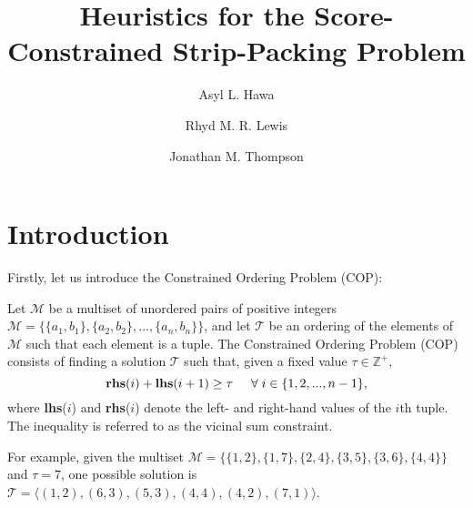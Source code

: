 \documentclass[oribibl]{llncs}
\begin{document}
	
\title{Heuristics for the Score-Constrained Strip-Packing Problem}
\author{Asyl L. Hawa \and Rhyd M. R. Lewis \and Jonathan M. Thompson}
\maketitle

\begin{abstract}
\end{abstract}

\section{Introduction}
\label{sec:intro}
Firstly, let us introduce the Constrained Ordering Problem (COP):

\begin{definition}
	\label{defn:cop}
	Let $\mathcal{M}$ be a multiset of unordered pairs of positive integers $\mathcal{M} = \{\{a_1, b_1\}, \{a_2,b_2\},...,\{a_n,b_n\}\}$, and let $\mathcal{T}$ be an ordering of the elements of $\mathcal{M}$ such that each element is a tuple. The Constrained Ordering Problem (COP) consists of finding a solution $\mathcal{T}$ such that, given a fixed value $\tau \in \mathbb{Z}^{+},$
	\begin{equation}
		\label{eqn:vsc}
		\textup{\textbf{rhs}}(i) + \textup{\textbf{lhs}}(i+1) \geq \tau \hspace{5mm} \forall \hspace{1mm} i \in \{1,2,..., n-1\},
	\end{equation}
	where \textup{\textbf{lhs}($i$)} and \textup{\textbf{rhs}($i$)} denote the left- and right-hand values of the $i$th tuple. The inequality is referred to as the \textup{vicinal sum constraint}.
\end{definition}

For example, given the multiset $\mathcal{M} = \{\{1,2\}, \{1,7\}, \{2,4\}, \{3,5\}, \{3,6\}, \{4,4\}\}$ and $\tau = 7$, one possible solution is $\mathcal{T} = \langle(1,2), (6,3), (5,3), (4,4), (4,2), (7,1) \rangle$.
\end{document}
